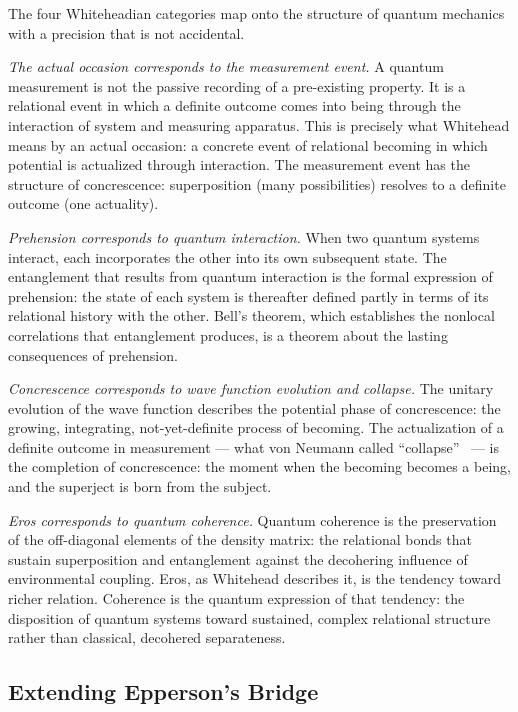 The four Whiteheadian categories map onto the structure of quantum mechanics
with a precision that is not accidental.

\emph{The actual occasion corresponds to the measurement event.}
A quantum measurement is not the passive recording of a pre-existing
property.
It is a relational event in which a definite outcome comes into being
through the interaction of system and measuring apparatus.
This is precisely what Whitehead means by an actual occasion: a concrete
event of relational becoming in which potential is actualized through
interaction.
The measurement event has the structure of concrescence: superposition
(many possibilities) resolves to a definite outcome (one actuality).

\emph{Prehension corresponds to quantum interaction.}
When two quantum systems interact, each incorporates the other into its
own subsequent state.
The entanglement that results from quantum interaction is the formal
expression of prehension: the state of each system is thereafter defined
partly in terms of its relational history with the other.
Bell's theorem, which establishes the nonlocal correlations that entanglement
produces, is a theorem about the lasting consequences of prehension.

\emph{Concrescence corresponds to wave function evolution and collapse.}
The unitary evolution of the wave function describes the potential phase
of concrescence: the growing, integrating, not-yet-definite process of
becoming.
The actualization of a definite outcome in measurement --- what von Neumann
called ``collapse''~\citep{vonNeumann1932} --- is the completion of
concrescence: the moment when the becoming becomes a being, and the
superject is born from the subject.

\emph{Eros corresponds to quantum coherence.}
Quantum coherence is the preservation of the off-diagonal elements of
the density matrix: the relational bonds that sustain superposition
and entanglement against the decohering influence of environmental
coupling.
Eros, as Whitehead describes it, is the tendency toward richer relation.
Coherence is the quantum expression of that tendency: the disposition of
quantum systems toward sustained, complex relational structure rather than
classical, decohered separateness.

\subsection{Extending Epperson's Bridge}

